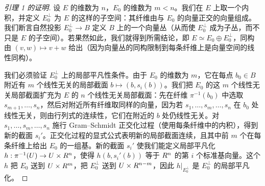 \begin{proof}[引理 1 的证明]
设 $E$ 的维数为 $n$，$E_0$ 的维数为 $m<n$。我们在 $E$ 上取一个内积，并定义 $E_0^\perp$ 为 $E$ 的这样的子空间：其纤维由与 $E_0$ 的向量正交的向量组成。我们断言自然投影 $E_0^\perp\to B$ 定义 $B$ 上的一个向量丛（从而使 $E_0^\perp$ 成为子丛，而不只是 $E$ 的子空间）。若果然如此，我们就得到所需结论，即 $E\simeq E_0\oplus E_0^\perp$，同构由 $(v,w)\mapsto v+w$ 给出（因为向量丛的同构限制到每条纤维上是向量空间的线性同构）。

我们必须验证 $E_0^\perp$ 上的局部平凡性条件。由于 $E_0$ 的维数为 $m$，它在每点 $b_0\in B$ 附近有 $m$ 个线性无关的局部截面 $b\mapsto(b,s_i(b))$。我们把 $E_0$ 的这 $m$ 个线性无关局部截面扩充为 $E$ 的 $n$ 个线性无关局部截面：先在纤维 $\pi^{-1}(b_0)$ 中选取 $s_{m+1},\dots,s_n$，然后对附近所有纤维取同样的向量，因为若 $s_1,\dots,s_m,\dots,s_n$ 在 $b_0$ 处线性无关，则由行列式的连续性，它们在附近的 $b$ 处仍线性无关。对 $s_1,\dots,s_m,\dots,s_n$ 施行 Gram--Schmidt 正交化过程（使用每条纤维中的内积），得到新的截面 $s_i'$。正交化过程的显式公式表明新的局部截面连续，且其中前 $m$ 个在每条纤维上给出 $E_0$ 的一组基。新的截面 $s_i'$ 使我们能定义局部平凡化 $h: \pi^{-1}(U)\to U\times R^n$，使得 $h(b,s_i'(b))$ 等于 $R^n$ 的第 $i$ 个标准基向量。这个 $h$ 把 $E_0$ 送到 $U\times R^m$，把 $E_0^\perp$ 送到 $U\times R^{n-m}$，因此 $h|_{E_0^\perp}$ 是 $E_0^\perp$ 的局部平凡化。
\end{proof}


